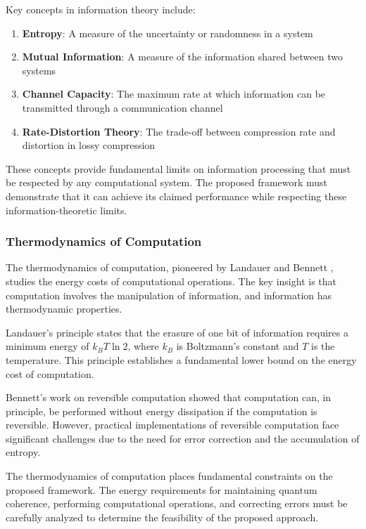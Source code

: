 \documentclass[12pt,a4paper]{article}
\theoremstyle{definition}
\begin{document}
{Key concepts in information theory include:

\begin{enumerate}
\item \textbf{Entropy}: A measure of the uncertainty or randomness in a system
\item \textbf{Mutual Information}: A measure of the information shared between two systems
\item \textbf{Channel Capacity}: The maximum rate at which information can be transmitted through a communication channel
\item \textbf{Rate-Distortion Theory}: The trade-off between compression rate and distortion in lossy compression
\end{enumerate}

These concepts provide fundamental limits on information processing that must be respected by any computational system. The proposed framework must demonstrate that it can achieve its claimed performance while respecting these information-theoretic limits.

\subsubsection{Thermodynamics of Computation}

The thermodynamics of computation, pioneered by Landauer \cite{landauer1961irreversibility} and Bennett \cite{bennett1982thermodynamics}, studies the energy costs of computational operations. The key insight is that computation involves the manipulation of information, and information has thermodynamic properties.

Landauer's principle states that the erasure of one bit of information requires a minimum energy of $k_B T \ln 2$, where $k_B$ is Boltzmann's constant and $T$ is the temperature. This principle establishes a fundamental lower bound on the energy cost of computation.

Bennett's work on reversible computation showed that computation can, in principle, be performed without energy dissipation if the computation is reversible. However, practical implementations of reversible computation face significant challenges due to the need for error correction and the accumulation of entropy.

The thermodynamics of computation places fundamental constraints on the proposed framework. The energy requirements for maintaining quantum coherence, performing computational operations, and correcting errors must be carefully analyzed to determine the feasibility of the proposed approach.

}
\end{document}
